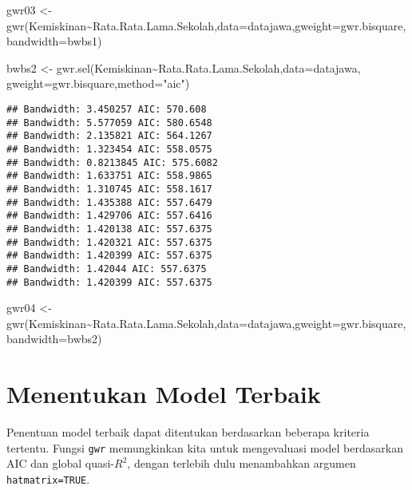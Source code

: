 \documentclass[
]{book}
\newenvironment{Shaded}{\begin{snugshade}}{\end{snugshade}}
\newcommand{\AttributeTok}[1]{\textcolor[rgb]{0.77,0.63,0.00}{#1}}
\newcommand{\FunctionTok}[1]{\textcolor[rgb]{0.00,0.00,0.00}{#1}}
\newcommand{\NormalTok}[1]{#1}
\newcommand{\OtherTok}[1]{\textcolor[rgb]{0.56,0.35,0.01}{#1}}
\newcommand{\SpecialCharTok}[1]{\textcolor[rgb]{0.00,0.00,0.00}{#1}}
\newcommand{\StringTok}[1]{\textcolor[rgb]{0.31,0.60,0.02}{#1}}
\begin{document}
\begin{Shaded}
\begin{Highlighting}[]
\NormalTok{gwr03 }\OtherTok{\textless{}{-}} \FunctionTok{gwr}\NormalTok{(Kemiskinan}\SpecialCharTok{\textasciitilde{}}\NormalTok{Rata.Rata.Lama.Sekolah,}\AttributeTok{data=}\NormalTok{datajawa,}\AttributeTok{gweight=}\NormalTok{gwr.bisquare,}
    \AttributeTok{bandwidth=}\NormalTok{bwbs1)}

\NormalTok{bwbs2 }\OtherTok{\textless{}{-}} \FunctionTok{gwr.sel}\NormalTok{(Kemiskinan}\SpecialCharTok{\textasciitilde{}}\NormalTok{Rata.Rata.Lama.Sekolah,}\AttributeTok{data=}\NormalTok{datajawa,}
                 \AttributeTok{gweight=}\NormalTok{gwr.bisquare,}\AttributeTok{method=}\StringTok{"aic"}\NormalTok{)}
\end{Highlighting}
\end{Shaded}

\begin{verbatim}
## Bandwidth: 3.450257 AIC: 570.608 
## Bandwidth: 5.577059 AIC: 580.6548 
## Bandwidth: 2.135821 AIC: 564.1267 
## Bandwidth: 1.323454 AIC: 558.0575 
## Bandwidth: 0.8213845 AIC: 575.6082 
## Bandwidth: 1.633751 AIC: 558.9865 
## Bandwidth: 1.310745 AIC: 558.1617 
## Bandwidth: 1.435388 AIC: 557.6479 
## Bandwidth: 1.429706 AIC: 557.6416 
## Bandwidth: 1.420138 AIC: 557.6375 
## Bandwidth: 1.420321 AIC: 557.6375 
## Bandwidth: 1.420399 AIC: 557.6375 
## Bandwidth: 1.42044 AIC: 557.6375 
## Bandwidth: 1.420399 AIC: 557.6375
\end{verbatim}

\begin{Shaded}
\begin{Highlighting}[]
\NormalTok{gwr04 }\OtherTok{\textless{}{-}} \FunctionTok{gwr}\NormalTok{(Kemiskinan}\SpecialCharTok{\textasciitilde{}}\NormalTok{Rata.Rata.Lama.Sekolah,}\AttributeTok{data=}\NormalTok{datajawa,}\AttributeTok{gweight=}\NormalTok{gwr.bisquare,}
    \AttributeTok{bandwidth=}\NormalTok{bwbs2)}
\end{Highlighting}
\end{Shaded}

\hypertarget{menentukan-model-terbaik}{%
\section{Menentukan Model Terbaik}\label{menentukan-model-terbaik}}

Penentuan model terbaik dapat ditentukan berdasarkan beberapa kriteria tertentu. Fungsi \texttt{gwr} memungkinkan kita untuk mengevaluasi model berdasarkan AIC dan global quasi-\(R^2\), dengan terlebih dulu menambahkan argumen \texttt{hatmatrix=TRUE}.
\end{document}
